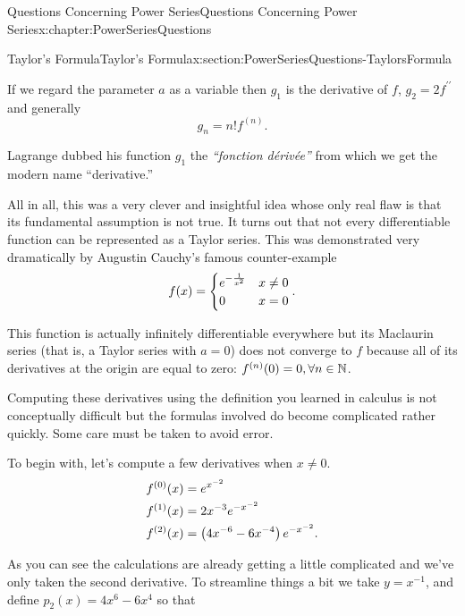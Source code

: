 \begin{chapterptx}{Questions Concerning Power Series}{}{Questions Concerning Power Series}{}{}{x:chapter:PowerSeriesQuestions}
\begin{sectionptx}{Taylor's Formula}{}{Taylor's Formula}{}{}{x:section:PowerSeriesQuestions-TaylorsFormula}
\begin{equation*}
		\end{equation*}
		\par
		If we regard the parameter \(a\) as a variable then \(g_1\) is the derivative of \(f\), \(g_2=2f^{\prime\prime}\) and generally%
		\begin{equation*}
			g_n=n!f^{(n)}\text{.}
		\end{equation*}
		\par
		Lagrange dubbed his function \(g_1\) the \textit{``fonction dérivée''} from which we get the modern name ``derivative.''%
		\par
		All in all, this was a very clever and insightful idea whose only real flaw is that its fundamental assumption is not true. It turns out that not every differentiable function can be represented as a Taylor series. This was demonstrated very dramatically by Augustin Cauchy's  famous counter-example%
		\begin{equation}
			f(x) = \begin{cases} e^{-\frac{1}{x^2}}&  x\ne0\\ 0 & x=0 \end{cases}\text{.}\label{x:men:eq_CauchyCounterEx}
		\end{equation}
		\par
		This function is actually infinitely differentiable everywhere but its Maclaurin series (that is, a Taylor series with \(a=0\)) does not converge to \(f\) because all of its derivatives at the origin are equal to zero: \(f^{(n)}(0) = 0, \forall n\in\mathbb {N}\).%
		\par
		Computing these derivatives using the definition you learned in calculus is not conceptually difficult but the formulas involved do become complicated rather quickly. Some care must be taken to avoid error.%
		\par
		To begin with, let's compute a few derivatives when \(x \neq 0\).%
		\begin{align*}
			f^{(0)}(x) & = e^{x^{-2}}\\
			f^{(1)}(x) & = 2x^{-3}e^{-x^{-2}}\\
			f^{(2)}(x) & = \left(4x^{-6}-6x^{-4}\right)e^{-x^{-2}}\text{.}
		\end{align*}
		\par
		As you can see the calculations are already getting a little complicated and we've only taken the second derivative. To streamline things a bit we take \(y= x^{-1}\), and define \(p_2(x) = 4x^6-6x^4\) so that%
		\begin{equation*}

\end{equation*}
\end{sectionptx}
\end{chapterptx}
